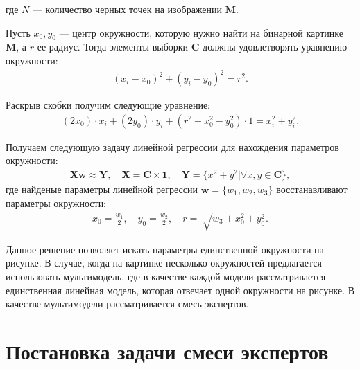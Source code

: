\documentclass[12pt, twoside]{article}
\numberwithin{equation}{section}
\begin{document}
где $N$ --- количество черных точек на изображении $\textbf{M}$.

Пусть $x_0, y_0$ --- центр окружности, которую нужно найти на бинарной картинке $\textbf{M}$, а $r$ ее радиус. Тогда элементы выборки $\textbf{C}$ должны удовлетворять уравнению окружности:
\begin{equation}
\label{eq:st:cr:3}
\begin{aligned}
\left(x_i - x_0\right)^{2}+\left(y_i-y_0\right)^2 = r^2.
\end{aligned}
\end{equation}

Раскрыв скобки получим следующие уравнение:
\begin{equation}
\label{eq:st:cr:4}
\begin{aligned}
(2x_0)\cdot x_i + (2y_0)\cdot y_i+(r^2-x_0^2-y_0^2)\cdot1 = x_{i}^2 + y_{i}^2.
\end{aligned}
\end{equation}

Получаем следующую задачу линейной регрессии для нахождения параметров окружности:
\begin{equation}
\label{eq:st:cr:5}
\begin{aligned}
\textbf{X}\textbf{w} \approx \textbf{Y},  \quad \textbf{X} = \textbf{C}\times \textbf{1}, \quad \textbf{Y} = \{x^2+y^2| \forall x,y \in \textbf{C}\},
\end{aligned}
\end{equation}
где найденые параметры линейной регрессии $\textbf{w} = \{w_1, w_2, w_3\}$ восстанавливают параметры окружности:
\begin{equation}
\label{eq:st:cr:6}
\begin{aligned}
x_0 = \frac{w_1}{2}, \quad y_0 = \frac{w_2}{2}, \quad r = \sqrt[]{w_3+x_{0}^{2}+y_{0}^{2}}.
\end{aligned}
\end{equation}

Данное решение позволяет искать параметры единственной окружности на рисунке. В случае, когда на картинке несколько окружностей предлагается использовать мультимодель, где в качестве каждой модели рассматривается единственная линейная модель, которая отвечает одной окружности на рисунке. В качестве мультимодели рассматривается смесь экспертов.

\section{Постановка задачи смеси экспертов}
\end{document}
